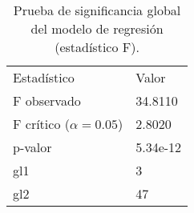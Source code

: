 \begin{table}[H]
    \centering
    \color{blue}
    \caption{Prueba de significancia global del modelo de regresión (estadístico F).}
    \label{tab:prueba_f}
    \begin{tabular}{ll}
        
        Estadístico & Valor \\
        
        F observado        & 34.8110 \\
        F crítico ($\alpha=0.05$) & 2.8020 \\
        p-valor            & 5.34e-12 \\
        gl1                & 3 \\
        gl2                & 47 \\
        
    \end{tabular}
\end{table}
